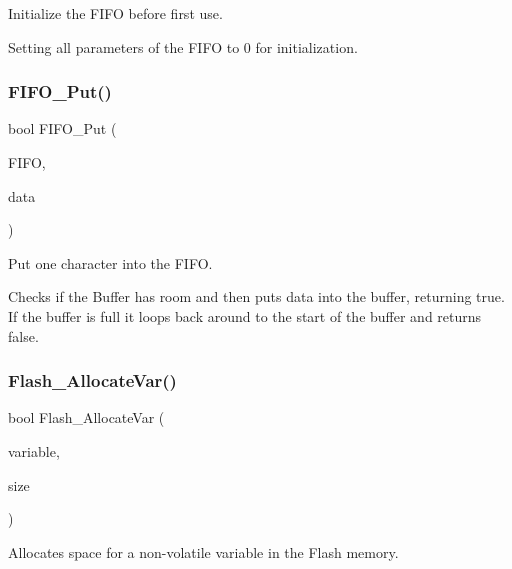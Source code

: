 Initialize the F\+I\+FO before first use. 

Setting all parameters of the F\+I\+FO to 0 for initialization. \mbox{\label{group__main__module_gace64ba4e6bd943f990a294693156cc3b}} 
\subsubsection{\texorpdfstring{F\+I\+F\+O\+\_\+\+Put()}{FIFO\_Put()}}
{\footnotesize\ttfamily bool F\+I\+F\+O\+\_\+\+Put (\begin{DoxyParamCaption}\item[{\hyperlink{struct_t_f_i_f_o}{T\+F\+I\+FO} $\ast$const}]{F\+I\+FO,  }\item[{const uint8\+\_\+t}]{data }\end{DoxyParamCaption})}



Put one character into the F\+I\+FO. 

Checks if the Buffer has room and then puts data into the buffer, returning true. If the buffer is full it loops back around to the start of the buffer and returns false. \mbox{\label{group__main__module_ga50871aff0f5af1e092aea3ed2545cf72}} 
\subsubsection{\texorpdfstring{Flash\+\_\+\+Allocate\+Var()}{Flash\_AllocateVar()}}
{\footnotesize\ttfamily bool Flash\+\_\+\+Allocate\+Var (\begin{DoxyParamCaption}\item[{volatile void $\ast$$\ast$}]{variable,  }\item[{const uint8\+\_\+t}]{size }\end{DoxyParamCaption})}



Allocates space for a non-\/volatile variable in the Flash memory. 


